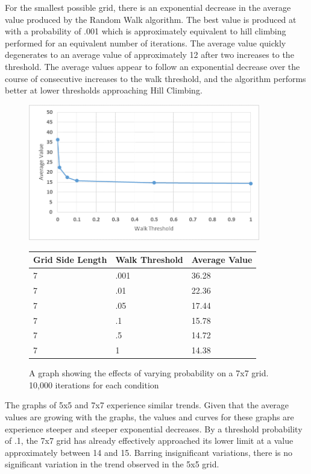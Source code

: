 \documentclass[12pt]{article}
\begin{document}
 For the smallest possible grid, there is an exponential decrease in the average value produced by the Random Walk algorithm. The best value is produced at with a probability of .001 which is approximately equivalent to hill climbing performed for an equivalent number of iterations. The average value quickly degenerates to an average value of approximately 12 after two increases to the threshold. The average values appear to follow an exponential decrease over the course of consecutive increases to the walk threshold, and the algorithm performs better at lower thresholds approaching Hill Climbing.
 
\begin{figure}[H]
    \centering
    \includegraphics[width=0.9\textwidth]{7x7_RWprob}
\begin{tabular}{ |p{4cm}||p{4cm}|p{4cm}|  }
 \hline
Grid Side Length&Walk Threshold&Average Value\\
 \hline
7&.001&36.28\\
7&.01&22.36\\
7&.05&17.44\\
7&.1&15.78\\
7&.5&14.72\\
7&1&14.38\\
 \hline
\end{tabular}
    \caption{A graph showing the effects of varying probability on a 7x7 grid. 10,000 iterations for each condition}
    \label{fig:RWprob7x7}
\end{figure}
 
 The graphs of 5x5 and 7x7 experience similar trends. Given that the average values are growing with the graphs, the values and curves for these graphs are experience steeper and steeper exponential decreases. By a threshold probability of .1, the 7x7 grid has already effectively approached its lower limit at a value approximately between 14 and 15. Barring insignificant variations, there is no significant variation in the trend observed in the 5x5 grid.
 
\end{document}
